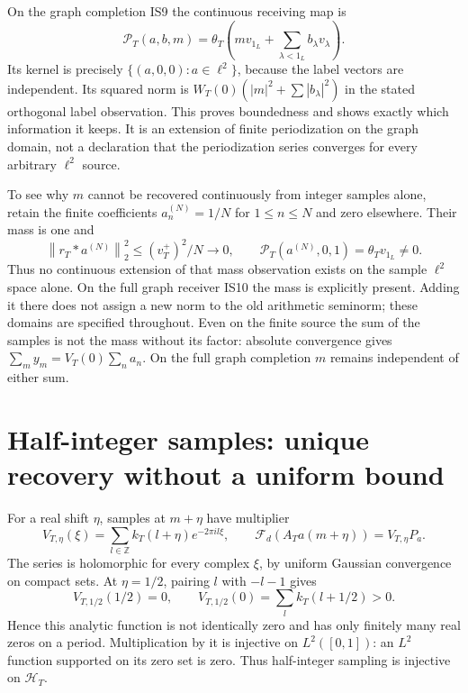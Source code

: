 \documentclass[11pt]{article}
\newcommand{\Z}{\mathbb Z}\newcommand{\C}{\mathbb C}\newcommand{\R}{\mathbb R}
\newcommand{\norm}[1]{\left\|#1\right\|}
\begin{document}
On the graph completion IS9 the continuous receiving map is
\begin{equation}
\mathscr P_T(a,b,m)=\theta_T\left(mv_{1_L}+\sum_{\lambda<1_L}b_\lambda v_\lambda\right).
 \tag{IS17}
\end{equation}
Its kernel is precisely $\{(a,0,0):a\in\ell^2\}$, because the label vectors are independent. Its squared norm is $W_T(0)(|m|^2+\sum|b_\lambda|^2)$ in the stated orthogonal label observation. This proves boundedness and shows exactly which information it keeps. It is an extension of finite periodization on the graph domain, not a declaration that the periodization series converges for every arbitrary $\ell^2$ source.

To see why $m$ cannot be recovered continuously from integer samples alone, retain the finite coefficients $a_n^{(N)}=1/N$ for $1\le n\le N$ and zero elsewhere. Their mass is one and
\begin{equation}
\norm{r_T*a^{(N)}}_2^2\le(v_T^+)^2/N\longrightarrow0,
\qquad\mathscr P_T(a^{(N)},0,1)=\theta_Tv_{1_L}\ne0. \tag{IS18}
\end{equation}
Thus no continuous extension of that mass observation exists on the sample $\ell^2$ space alone. On the full graph receiver IS10 the mass is explicitly present. Adding it there does not assign a new norm to the old arithmetic seminorm; these domains are specified throughout.
Even on the finite source the sum of the samples is not the mass without its factor: absolute convergence gives $\sum_my_m=V_T(0)\sum_na_n$. On the full graph completion $m$ remains independent of either sum.

\section{Half-integer samples: unique recovery without a uniform bound}
For a real shift $\eta$, samples at $m+\eta$ have multiplier
\begin{equation}
V_{T,\eta}(\xi)=\sum_{l\in\Z}k_T(l+\eta)e^{-2\pi il\xi},\qquad
\mathcal F_d(A_Ta(m+\eta))=V_{T,\eta}P_a. \tag{IS19}
\end{equation}
The series is holomorphic for every complex $\xi$, by uniform Gaussian convergence on compact sets. At $\eta=1/2$, pairing $l$ with $-l-1$ gives
\begin{equation}
V_{T,1/2}(1/2)=0,\qquad V_{T,1/2}(0)=\sum_lk_T(l+1/2)>0. \tag{IS20}
\end{equation}
Hence this analytic function is not identically zero and has only finitely many real zeros on a period. Multiplication by it is injective on $L^2([0,1])$: an $L^2$ function supported on its zero set is zero. Thus half-integer sampling is injective on $\mathcal H_T$.
\end{document}
